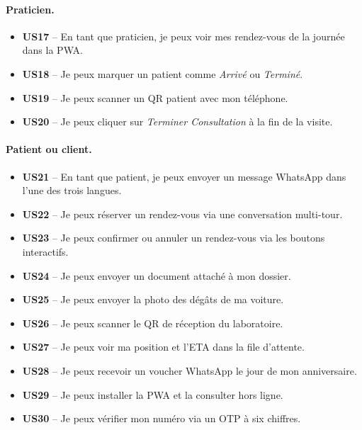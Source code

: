 \paragraph{Praticien.}
\begin{itemize}[leftmargin=1.5em,itemsep=2pt,topsep=2pt]
  \item \textbf{US17} -- En tant que praticien, je peux voir mes rendez-vous de la journée dans la PWA.
  \item \textbf{US18} -- Je peux marquer un patient comme \emph{Arrivé} ou \emph{Terminé}.
  \item \textbf{US19} -- Je peux scanner un QR patient avec mon téléphone.
  \item \textbf{US20} -- Je peux cliquer sur \emph{Terminer Consultation} à la fin de la visite.
\end{itemize}

\paragraph{Patient ou client.}
\begin{itemize}[leftmargin=1.5em,itemsep=2pt,topsep=2pt]
  \item \textbf{US21} -- En tant que patient, je peux envoyer un message WhatsApp dans l'une des trois langues.
  \item \textbf{US22} -- Je peux réserver un rendez-vous via une conversation multi-tour.
  \item \textbf{US23} -- Je peux confirmer ou annuler un rendez-vous via les boutons interactifs.
  \item \textbf{US24} -- Je peux envoyer un document attaché à mon dossier.
  \item \textbf{US25} -- Je peux envoyer la photo des dégâts de ma voiture.
  \item \textbf{US26} -- Je peux scanner le QR de réception du laboratoire.
  \item \textbf{US27} -- Je peux voir ma position et l'ETA dans la file d'attente.
  \item \textbf{US28} -- Je peux recevoir un voucher WhatsApp le jour de mon anniversaire.
  \item \textbf{US29} -- Je peux installer la PWA \nova{} et la consulter hors ligne.
  \item \textbf{US30} -- Je peux vérifier mon numéro via un OTP à six chiffres.
\end{itemize}

